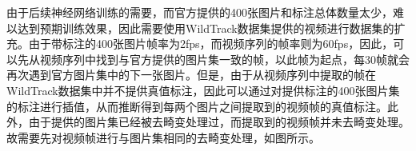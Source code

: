 
由于后续神经网络训练的需要，而官方提供的400张图片和标注总体数量太少，难以达到预期训练效果，因此需要使用WildTrack数据集提供的视频进行数据集的扩充。由于带标注的400张图片帧率为2fps，而视频序列的帧率则为60fps，因此，可以先从视频序列中找到与官方提供的图片集一致的帧，以此帧为起点，每30帧就会再次遇到官方图片集中的下一张图片。但是，由于从视频序列中提取的帧在WildTrack数据集中并不提供真值标注，因此可以通过对提供标注的400张图片集的标注进行插值，从而推断得到每两个图片之间提取到的视频帧的真值标注。此外，由于提供的图片集已经被去畸变处理过，而提取到的视频帧并未去畸变处理。故需要先对视频帧进行与图片集相同的去畸变处理，如图所示。


